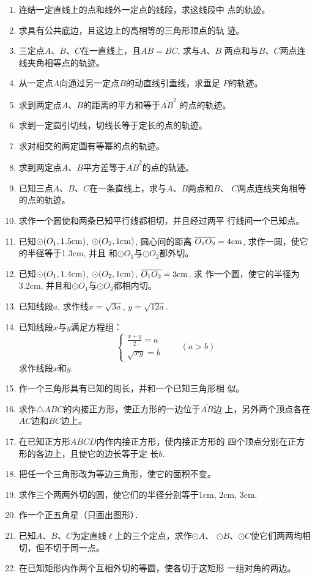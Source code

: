 \begin{enumerate}
    \item 连结一定直线上的点和线外一定点的线段，求这线段中
    点的轨迹。
    \item 求具有公共底边，且这边上的高相等的三角形顶点的轨
    迹。
    \item 三定点$A$、$B$、$C$在一直线上，且$\overline{AB}=\overline{BC}$, 求与$A$、$B$
    两点和与$B$、$C$两点连线夹角相等点的轨迹。
    \item 从一定点$A$向通过另一定点$B$的动直线引垂线，求垂足
    $P$的轨迹。
    \item 求到两定点$A$、$B$的距离的平方和等于$\overline{AB}^2$
    的点的轨迹。
    \item 求到一定圆引切线，切线长等于定长的点的轨迹。
    \item 求对相交的两定圆有等幂的点的轨迹。
    \item 求到两定点$A$、$B$平方差等于$\overline{AB}^2$的点的轨迹。
    \item 已知三点$A$、$B$、$C$在一条直线上，求与$A$、$B$两点和$B$、
   $ C$两点连线夹角相等的点的轨迹。
    \item 求作一个圆使和两条已知平行线都相切，并且经过两平
    行线间一个已知点。
    \item 已知$\odot(O_1,1.5{\rm cm})$, $\odot(O_2,1{\rm cm})$, 圆心间的距离
    $\overline{O_1O_2}=4{\rm cm}$, 求作一圆，使它的半径等于1.3cm, 并且
    和$\odot O_1$与$\odot O_2$都外切。
    \item 已知$\odot(O_1,1.4{\rm cm})$, $\odot(O_2,1{\rm cm})$, $\overline{O_1O_2}=3{\rm cm}$, 求
    作一个圆，使它的半径为3.2cm, 并且和$\odot O_1$与$\odot O_2$都相内切。
    \item 已知线段$a$, 求作线$x=\sqrt{3a}$, $y=\sqrt{12a}$.
    \item 已知线段$x$与$y$满足方程组：
    \[\begin{cases}
        \frac{x+y}{2}=a\\
        \sqrt{xy}=b
    \end{cases}\qquad (a>b)\]
    求作线段$x$和$y$. 
    \item 作一个三角形具有已知的周长，并和一个已知三角形相
似。
\item 求作$\triangle ABC$的内接正方形，使正方形的一边位于$\overline{AB}$边
上，另外两个顶点各在$\overline{AC}$边和$\overline{BC}$边上。
\item 在已知正方形$ABCD$内作内接正方形，使内接正方形的
四个顶点分别在正方形的各边上，且使它的边长等于定
长$b$.
\item 把任一个三角形改为等边三角形，使它的面积不变。
\item 求作三个两两外切的圆，使它们的半径分别等于1cm,
 2cm, 3cm.
\item 作一个正五角星（只画出图形）．
\item 已知$A$、$B$、$C$为定直线$\ell$上的三个定点，求作$\odot A$、
$\odot B$、$\odot C$使它们两两均相切，但不切于同一点。
\item 在已知矩形内作两个互相外切的等圆，使各切于这矩形
一组对角的两边。
\end{enumerate}












